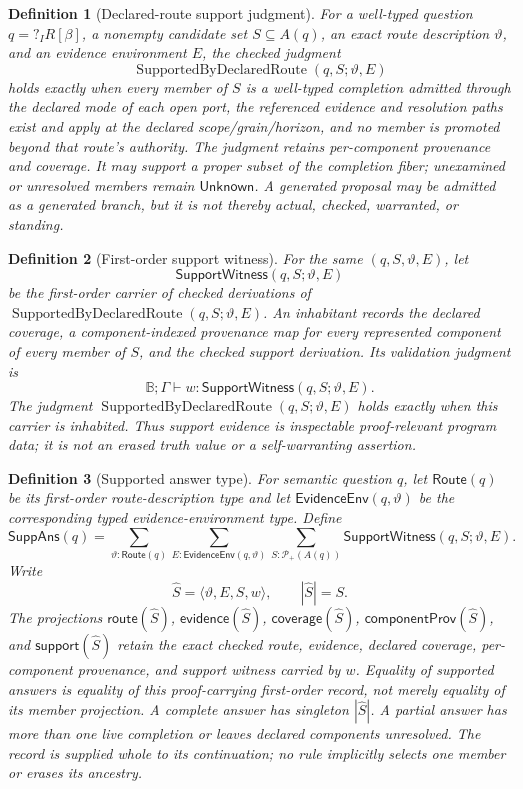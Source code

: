 \documentclass[11pt,oneside]{article}
\newtheorem{definition}{Definition}[section]
\newcommand{\B}{\mathbb B}
\newcommand{\SupportedRoute}{\operatorname{SupportedByDeclaredRoute}}
\begin{document}
\begin{definition}[Declared-route support judgment]\label{def:declared-route-support}
For a well-typed question \(q=?_I R[\beta]\), a nonempty candidate set
\(S\subseteq A(q)\), an exact route description \(\vartheta\), and an evidence environment
\(E\), the checked judgment
\[
\SupportedRoute(q,S;\vartheta,E)
\]
holds exactly when every member of \(S\) is a well-typed completion admitted through the declared
mode of each open port, the referenced evidence and resolution paths exist and apply at the declared
scope/grain/horizon, and no member is promoted beyond that route's authority.  The judgment retains
per-component provenance and coverage.  It may support a proper subset of the completion fiber;
unexamined or unresolved members remain \(\mathsf{Unknown}\).  A generated proposal may be admitted
as a generated branch, but it is not thereby actual, checked, warranted, or standing.
\end{definition}

\begin{definition}[First-order support witness]\label{def:support-witness}
For the same \((q,S,\vartheta,E)\), let
\[
\mathsf{SupportWitness}(q,S;\vartheta,E)
\]
be the first-order carrier of checked derivations of
\(\SupportedRoute(q,S;\vartheta,E)\).  An inhabitant records the declared coverage, a
component-indexed provenance map for every represented component of every member of \(S\), and the
checked support derivation.  Its validation judgment is
\[
\B;\Gamma\vdash
w:\mathsf{SupportWitness}(q,S;\vartheta,E).
\]
The judgment \(\SupportedRoute(q,S;\vartheta,E)\) holds exactly when this carrier is inhabited.
Thus support evidence is inspectable proof-relevant program data; it is not an erased truth value or
a self-warranting assertion.
\end{definition}

\begin{definition}[Supported answer type]\label{def:supported-answer-type}
For semantic question \(q\), let \(\mathsf{Route}(q)\) be its first-order route-description type and
let \(\mathsf{EvidenceEnv}(q,\vartheta)\) be the corresponding typed evidence-environment type.
Define
\[
\boxed{
\mathsf{SuppAns}(q)
=
\sum_{\vartheta:\mathsf{Route}(q)}
\sum_{E:\mathsf{EvidenceEnv}(q,\vartheta)}
\sum_{S:\mathcal P_+(A(q))}
\mathsf{SupportWitness}(q,S;\vartheta,E).
}
\]
Write
\[
\widehat S=\langle\vartheta,E,S,w\rangle,
\qquad
|\widehat S|=S.
\]
The projections \(\mathsf{route}(\widehat S)\), \(\mathsf{evidence}(\widehat S)\),
\(\mathsf{coverage}(\widehat S)\), \(\mathsf{componentProv}(\widehat S)\), and
\(\mathsf{support}(\widehat S)\) retain the exact checked route, evidence, declared coverage,
per-component provenance, and support witness carried by \(w\).  Equality of supported answers is
equality of this proof-carrying first-order record, not merely equality of its member projection.
A complete answer has singleton \(|\widehat S|\).  A partial answer has more than one live
completion or leaves declared components unresolved.  The record is supplied whole to its
continuation; no rule implicitly selects one member or erases its ancestry.
\end{definition}
\end{document}
